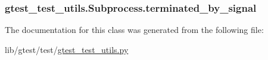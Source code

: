 \hypertarget{classgtest__test__utils_1_1_subprocess_a9654b9eddd43c93acf66d5c7b0026fca}{
\subsubsection[{terminated\-\_\-by\-\_\-signal}]{\setlength{\rightskip}{0pt plus 5cm}gtest\-\_\-test\-\_\-utils.\-Subprocess.\-terminated\-\_\-by\-\_\-signal}}\label{classgtest__test__utils_1_1_subprocess_a9654b9eddd43c93acf66d5c7b0026fca}


The documentation for this class was generated from the following file\-:\begin{DoxyCompactItemize}
\item 
lib/gtest/test/\hyperlink{gtest__test__utils_8py}{gtest\-\_\-test\-\_\-utils.\-py}\end{DoxyCompactItemize}
